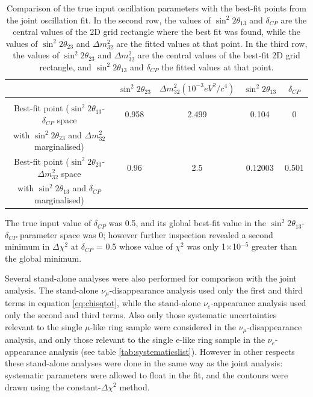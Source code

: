 \begin{table}[h]
\centering
\begin{tabular}{|c|c|c|c|c|}
\hline
  & $\sin^{2}2\theta_{23}$ & $\Delta m_{32}^{2} (10^{-3} eV^{2}/c^{4})$  & $\sin^{2}2\theta_{13}$ & $\delta_{CP}$ \\
\hline \hline
{\color{blue}{True input values}} & {\color{blue}{0.96}} & {\color{blue}{2.5}} & {\color{blue}{0.12}} & {\color{blue}{0.5}} \\
\hline 
Best-fit point ($\sin^{2}2\theta_{13}$-$\delta_{CP}$ space &  0.958& 2.499& 0.104 &  0\\
 with $\sin^{2}2\theta_{23}$ and $\Delta m_{32}^{2}$ marginalised) &  &  &  &  \\
\hline 
Best-fit point ($\sin^{2}2\theta_{23}$-$\Delta m_{32}^{2}$ space & 0.96 & 2.5 & 0.12003 & 0.501\\
with $\sin^{2}2\theta_{13}$ and $\delta_{CP}$ marginalised) &  &  &  &  \\
\hline
\end{tabular}
\caption{Comparison of the true input oscillation parameters with the best-fit points from the joint oscillation fit. In the second row, the values of 
$\sin^{2}2\theta_{13}$ and $\delta_{CP}$ are the central values of the 2D grid rectangle where the best fit was found, while the values of $\sin^{2}2\theta_{23}$ 
and $\Delta m_{32}^{2}$ are the fitted values at that point. In the third row, the values of $\sin^{2}2\theta_{23}$ and $\Delta m_{32}^{2}$ are the 
central values of the best-fit 2D grid rectangle, and $\sin^{2}2\theta_{13}$ and $\delta_{CP}$ the fitted values at that point.}
\label{tab:jointOAbestfit}
\end{table}
The true input value of $\delta_{CP}$ was 0.5, and its global best-fit value in the $\sin^{2}2\theta_{13}$-$\delta_{CP}$ parameter space was 0; however 
further inspection revealed a second minimum in $\Delta\chi^{2}$ at $\delta_{CP}$ = 0.5 whose value of $\chi^{2}$ was only 1$\times$10$^{-5}$ greater 
than the global minimum. 

Several stand-alone analyses were also performed for comparison with the joint analysis. The stand-alone $\nu_{\mu}$-disappearance analysis used only 
the first and third terms in equation \ref{eq:chisqtot}, while the stand-alone $\nu_{e}$-appearance analysis used only the second and third terms. Also only 
those systematic uncertainties relevant to the single $\mu$-like ring sample were considered in the $\nu_{\mu}$-disappearance analysis, and only those relevant 
to the single e-like ring sample in the $\nu_{e}$-appearance analysis (see table \ref{tab:systematicslist}). However in other respects these stand-alone analyses 
were done in the same way as the joint analysis: systematic parameters were allowed to float in the fit, and the contours were drawn using the 
constant-$\Delta \chi^{2}$ method. 


